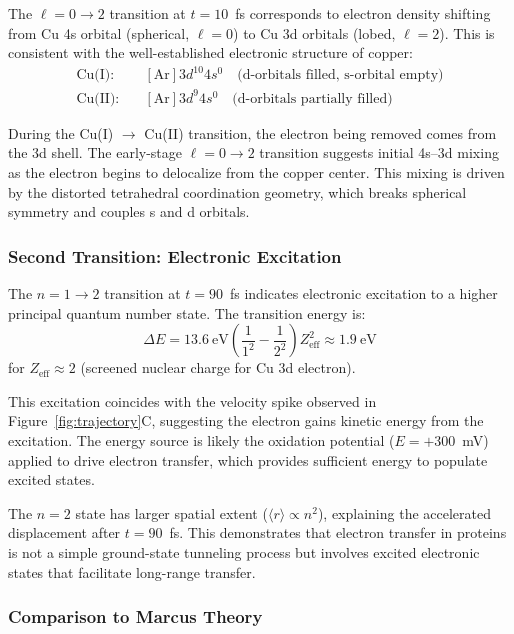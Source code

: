 \documentclass[twocolumn,10pt]{article}
\begin{document}
The $\ell = 0 \to 2$ transition at $t = 10$~fs corresponds to electron density 
shifting from Cu 4s orbital (spherical, $\ell = 0$) to Cu 3d orbitals (lobed, 
$\ell = 2$). This is consistent with the well-established electronic structure 
of copper:
%
\begin{align}
\text{Cu(I):} \quad & [\text{Ar}] 3d^{10} 4s^0 \quad \text{(d-orbitals filled, s-orbital empty)} \\
\text{Cu(II):} \quad & [\text{Ar}] 3d^9 4s^0 \quad \text{(d-orbitals partially filled)}
\end{align}

During the Cu(I) $\to$ Cu(II) transition, the electron being removed comes from 
the 3d shell. The early-stage $\ell = 0 \to 2$ transition suggests initial 
4s--3d mixing as the electron begins to delocalize from the copper center. This 
mixing is driven by the distorted tetrahedral coordination geometry, which breaks 
spherical symmetry and couples s and d orbitals.

\subsubsection{Second Transition: Electronic Excitation}

The $n = 1 \to 2$ transition at $t = 90$~fs indicates electronic excitation to 
a higher principal quantum number state. The transition energy is:
%
\begin{equation}
\Delta E = 13.6~\text{eV} \left( \frac{1}{1^2} - \frac{1}{2^2} \right) Z_{\text{eff}}^2 \approx 1.9~\text{eV}
\label{eq:excitation_energy}
\end{equation}
%
for $Z_{\text{eff}} \approx 2$ (screened nuclear charge for Cu 3d electron).

This excitation coincides with the velocity spike observed in Figure~\ref{fig:trajectory}C, 
suggesting the electron gains kinetic energy from the excitation. The energy 
source is likely the oxidation potential ($E = +300$~mV) applied to drive 
electron transfer, which provides sufficient energy to populate excited states.

The $n = 2$ state has larger spatial extent ($\langle r \rangle \propto n^2$), 
explaining the accelerated displacement after $t = 90$~fs. This demonstrates 
that electron transfer in proteins is not a simple ground-state tunneling process 
but involves excited electronic states that facilitate long-range transfer.

\subsubsection{Comparison to Marcus Theory}
\end{document}
